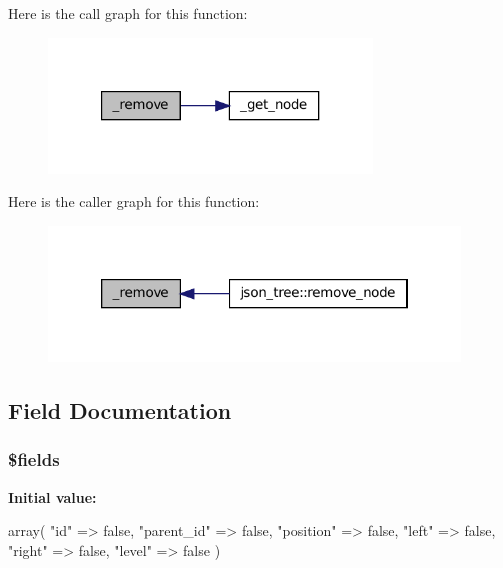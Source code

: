 Here is the call graph for this function:\nopagebreak
\begin{figure}[H]
\begin{center}
\leavevmode
\includegraphics[width=244pt]{class__tree__struct_a0fc184abc11c32c1cf813d707a681396_cgraph}
\end{center}
\end{figure}




Here is the caller graph for this function:\nopagebreak
\begin{figure}[H]
\begin{center}
\leavevmode
\includegraphics[width=310pt]{class__tree__struct_a0fc184abc11c32c1cf813d707a681396_icgraph}
\end{center}
\end{figure}




\subsection{Field Documentation}
\hypertarget{class__tree__struct_ab2303c817e3b402b77b7f99627b9c319}{
\subsubsection[{\$fields}]{\setlength{\rightskip}{0pt plus 5cm}\$fields}}
\label{class__tree__struct_ab2303c817e3b402b77b7f99627b9c319}
{\bfseries Initial value:}
\begin{DoxyCode}
 array(
            "id"        => false,
            "parent_id" => false,
            "position"  => false,
            "left"      => false,
            "right"     => false,
            "level"     => false
        )
\end{DoxyCode}


